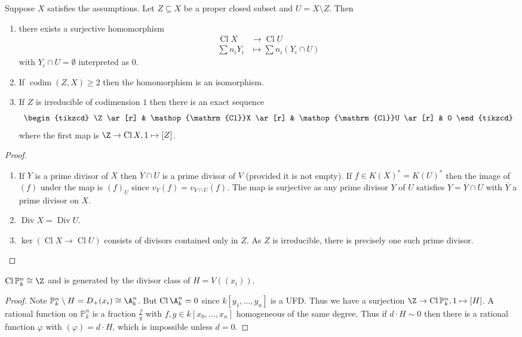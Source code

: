 \documentclass[a4paper]{article}
\renewcommand*{\P}{\mathbb{P}}
\DeclareMathOperator{\codim}{codim} %
\DeclareMathOperator{\Div}{Div} %
\DeclareMathOperator{\Cl}{Cl} %
\begin{document}
\begin{proposition}
  Suppose \(X\) satisfies the assumptions. Let \(Z \subseteq X\) be a proper closed subset and \(U = X \setminus Z\). Then
  \begin{enumerate}
  \item there exists a surjective homomorphism
    \begin{align*}
      \Cl X &\to \Cl U \\
      \sum n_i Y_i &\mapsto \sum n_i (Y_i \cap U)
    \end{align*}
    with \(Y_i \cap U = \emptyset\) interpreted as \(0\).
  \item If \(\codim(Z, X) \geq 2\) then the homomorphism is an isomorphism.
  \item If \(Z\) is irreducible of codimension \(1\) then there is an exact sequence
    \[
      \begin{tikzcd}
        \Z \ar[r] & \Cl X \ar[r] & \Cl U \ar[r] & 0
      \end{tikzcd}
    \]
    where the first map is \(\Z \to \Cl X, 1 \mapsto [Z]\).
  \end{enumerate}
\end{proposition}

\begin{proof}\leavevmode
  \begin{enumerate}
  \item If \(Y\) is a prime divisor of \(X\) then \(Y \cap U\) is a prime divisor of \(V\) (provided it is not empty). If \(f \in K(X)^* = K(U)^*\) then the image of \((f)\) under the map is \((f)_U\) since \(v_Y(f) = v_{Y \cap U}(f)\). The map is surjective as any prime divisor \(Y\) of \(U\) satisfies \(Y = \overline Y \cap U\) with \(\overline Y\) a prime divisor on \(X\).
  \item \(\Div X = \Div U\).
  \item \(\ker (\Cl X \to \Cl U)\) consists of divisors contained only in \(Z\). As \(Z\) is irreducible, there is precisely one such prime divisor.
  \end{enumerate}
\end{proof}

\begin{proposition}
  \(\Cl \P_k^n \cong \Z\) and is generated by the divisor class of \(H = V((x_i))\).
\end{proposition}

\begin{proof}
  Note \(\P^n_k \setminus H = D_+(x_i) \cong \A^n_k\). But \(\Cl \A_k^n = 0\) since \(k[y_1, \dots, y_n]\) is a UFD. Thus we have a surjection \(\Z \to \Cl \P_k^n, 1 \mapsto [H]\). A rational function on \(\P^n_k\) is a fraction \(\frac{f}{g}\) with \(f, g \in k[x_0, \dots, x_n]\) homogeneous of the same degree. Thus if \(d \cdot H \sim 0\) then there is a rational function \(\varphi\) with \((\varphi) = d \cdot H\), which is impossible unless \(d = 0\).
\end{proof}
\end{document}
